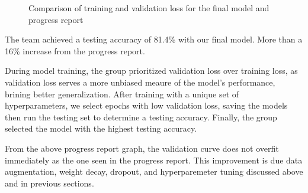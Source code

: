 \documentclass{article} %
\begin{document}
\FloatBarrier
\begin{figure}[h]
    \centering
    \hfill
    \caption{Comparison of training and validation loss for the final model and progress report}
    \label{fig:sideBySideGraphs}
\end{figure}
\FloatBarrier

The team achieved a testing accuracy of 81.4\% with our final model. More than a 16\% increase from the progress report.

During model training, the group prioritized validation loss over training loss, as validation loss serves a more unbiased meaure of the model's performance, brining better generalization. After training with a unique set of hyperparameters, we select epochs with low validation loss, saving the models then run the testing set to determine a testing accuracy. Finally, the group selected the model with the highest testing accuracy.

From the above progress report graph, the validation curve does not overfit immediately as the one seen in the progress report. This improvement is due data augmentation, weight decay, dropout, and hyperparemeter tuning discussed above and in previous sections. 
\end{document}
